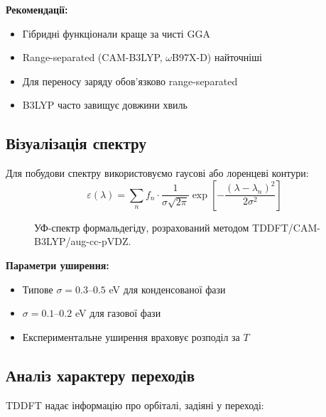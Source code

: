 \textbf{Рекомендації:}
\begin{itemize}
    \item Гібридні функціонали краще за чисті GGA
    \item Range-separated (CAM-B3LYP, $\omega$B97X-D) найточніші
    \item Для переносу заряду обов'язково range-separated
    \item B3LYP часто завищує довжини хвиль
\end{itemize}

\subsection{Візуалізація спектру}

Для побудови спектру використовуємо гаусові або лоренцеві контури:
\[
    \varepsilon(\lambda) = \sum_n f_n \cdot \frac{1}{\sigma\sqrt{2\pi}}
    \exp\left[-\frac{(\lambda - \lambda_n)^2}{2\sigma^2}\right]
\]


\begin{figure}[h!]\centering
    \caption{УФ-спектр формальдегіду, розрахований методом TDDFT/CAM-B3LYP/aug-cc-pVDZ.}
    \label{pic:h2co_uv_spectrum}
\end{figure}

\textbf{Параметри уширення:}
\begin{itemize}
    \item Типове $\sigma = 0.3$--$0.5$ eV для конденсованої фази
    \item $\sigma = 0.1$--$0.2$ eV для газової фази
    \item Експериментальне уширення враховує розподіл за $T$
\end{itemize}

\subsection{Аналіз характеру переходів}

TDDFT надає інформацію про орбіталі, задіяні у переході:

